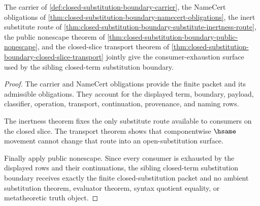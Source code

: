 \begin{theorem}
\label{thm:closed-substitution-boundary-consumer-exhaustion}
The carrier of \autoref{def:closed-substitution-boundary-carrier}, the NameCert obligations of \autoref{thm:closed-substitution-boundary-namecert-obligations}, the inert substitute route of \autoref{thm:closed-substitution-boundary-substitute-inertness-route}, the public nonescape theorem of \autoref{thm:closed-substitution-boundary-public-nonescape}, and the closed-slice transport theorem of \autoref{thm:closed-substitution-boundary-closed-slice-transport} jointly give the consumer-exhaustion surface used by the sibling closed-term substitution boundary.
\end{theorem}
\begin{proof}
The carrier and NameCert obligations provide the finite packet and its admissible obligations. They account for the displayed term, boundary, payload, classifier, operation, transport, continuation, provenance, and naming rows.

The inertness theorem fixes the only substitute route available to consumers on the closed slice. The transport theorem shows that componentwise $\hsame$ movement cannot change that route into an open-substitution surface.

Finally apply public nonescape. Since every consumer is exhausted by the displayed rows and their continuations, the sibling closed-term substitution boundary receives exactly the finite closed-substitution packet and no ambient substitution theorem, evaluator theorem, syntax quotient equality, or metatheoretic truth object.
\end{proof}

